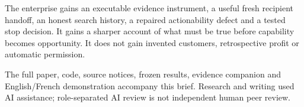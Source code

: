 \documentclass[
  10pt,
]{article}
\begin{document}
The enterprise gains an executable evidence instrument, a useful fresh
recipient handoff, an honest search history, a repaired actionability
defect and a tested stop decision. It gains a sharper account of what
must be true before capability becomes opportunity. It does not gain
invented customers, retrospective profit or automatic permission.

The full paper, code, source notices, frozen results, evidence companion
and English/French demonstration accompany this brief. Research and
writing used AI assistance; role-separated AI review is not independent
human peer review.
\end{document}
